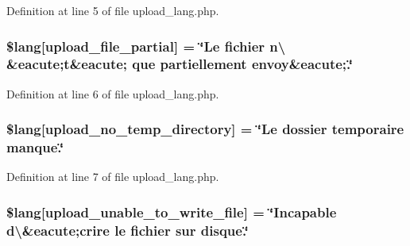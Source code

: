 Definition at line 5 of file upload\+\_\+lang.\+php.

\subsubsection[{\texorpdfstring{\$lang}{$lang}}]{\setlength{\rightskip}{0pt plus 5cm}\$lang\mbox{[}\textquotesingle{}upload\+\_\+file\+\_\+partial\textquotesingle{}\mbox{]} = \char`\"{}Le fichier n\textbackslash{} \&eacute;{\bf t}\&eacute; que partiellement envoy\&eacute;.\char`\"{}}\hypertarget{application_2language_2french_2upload__lang_8php_a79751b02ce35007a90bd9052f83deed9}{}\label{application_2language_2french_2upload__lang_8php_a79751b02ce35007a90bd9052f83deed9}


Definition at line 6 of file upload\+\_\+lang.\+php.

\subsubsection[{\texorpdfstring{\$lang}{$lang}}]{\setlength{\rightskip}{0pt plus 5cm}\$lang\mbox{[}\textquotesingle{}upload\+\_\+no\+\_\+temp\+\_\+directory\textquotesingle{}\mbox{]} = \char`\"{}Le dossier temporaire manque.\char`\"{}}\hypertarget{application_2language_2french_2upload__lang_8php_ac7144f4992346816875bac28488ef715}{}\label{application_2language_2french_2upload__lang_8php_ac7144f4992346816875bac28488ef715}


Definition at line 7 of file upload\+\_\+lang.\+php.

\subsubsection[{\texorpdfstring{\$lang}{$lang}}]{\setlength{\rightskip}{0pt plus 5cm}\$lang\mbox{[}\textquotesingle{}upload\+\_\+unable\+\_\+to\+\_\+write\+\_\+file\textquotesingle{}\mbox{]} = \char`\"{}Incapable d\textbackslash{}\textquotesingle{}\&eacute;crire le fichier sur disque.\char`\"{}}\hypertarget{application_2language_2french_2upload__lang_8php_a620b622468d4e7781fed6316440c85e7}{}\label{application_2language_2french_2upload__lang_8php_a620b622468d4e7781fed6316440c85e7}


